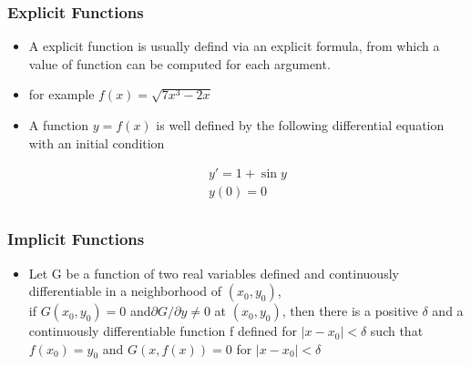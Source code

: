 \documentclass[notheorems,mathserif,table,compress]{beamer}  %
\begin{document}
\begin{frame}
  \frametitle{Explicit Functions}
  \begin{itemize}
  \item A explicit function is usually defind via an explicit formula, from which a value of function can be computed for each  argument.
  \item  for  example  $f(x)=\sqrt{7x^3-2x}$
  \item A function $y=f(x)$ is well defined  by  the following  differential equation  with  an  initial  condition 

   \begin{displaymath}
   \begin{array}{ll}
    y'=1+\sin y\\
    y(0)=0\\
   \end{array} 
   \end{displaymath}
   \end{itemize}
\end{frame}

\begin{frame}
  \frametitle{Implicit Functions}
  \begin{itemize}
  \item Let G be a function of two real variables defined and continuously differentiable  in a neighborhood of $(x_0,y_0)$, \\
   if $G(x_0,y_0)=0$ and$\partial G/\partial y\neq 0$ at $(x_0,y_0)$, then there is a positive $\delta$ and a continuously  differentiable function f  defined  for $|x-x_0|<\delta$ such that $f(x_0)=y_0$ and  $G(x,f(x))=0$ for $|x-x_0|<\delta$ 
   \end{itemize}
\end{frame}
\end{document}
